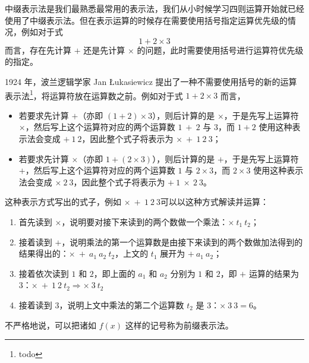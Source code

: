         中缀表示法是我们最熟悉最常用的表示法，我们从小时候学习四则运算开始就已经使用了中缀表示法。但在表示运算的时候存在需要使用括号指定运算优先级的情况，例如对于式 \[1 + 2 \times 3\] 而言，存在先计算 $+$ 还是先计算 $\times$ 的问题，此时需要使用括号进行运算符优先级的指定。

        1924 年，波兰逻辑学家 Jan {\L}ukasiewicz 提出了一种不需要使用括号的新的运算表示法\footnote{todo}，将运算符放在运算数之前。例如对于式 $1 + 2 \times 3$ 而言，
        \begin{itemize}
            \item 若要求先计算 $+$（亦即 $(1 + 2) \times 3$），则后计算的是 $\times$，于是先写上运算符 $\times$，然后写上这个运算符对应的两个运算数 $1\ +\ 2$ 与 $3$，而 $1 + 2$ 使用这种表示法会变成 $+\ 1\ 2$，因此整个式子将表示为 $\times\ +\ 1\ 2\ 3$；
            \item 若要求先计算 $\times$（亦即 $1 + (2 \times 3)$），则后计算的是 $+$，于是先写上运算符 $+$，然后写上这个运算符对应的两个运算数 $1$ 与 $2 \times 3$，而 $2 \times 3$ 使用这种表示法会变成 $\times\ 2\ 3$，因此整个式子将表示为 $+\ 1\ \times\ 2\ 3$。
        \end{itemize}
        这种表示方式写出的式子，例如 $\times\ +\ 1\ 2\ 3$可以以这种方式解读并运算：
        \begin{enumerate}
            \item 首先读到 $\times$，说明要对接下来读到的两个数做一个乘法：$\times\ t_1\ t_2$；
            \item 接着读到 $+$，说明乘法的第一个运算数是由接下来读到的两个数做加法得到的结果得出的：$\times\ +\ a_1\ a_2\ t_2$，上文的 $t_1$ 展开为 $+\ a_1\ a_2$；
            \item 接着依次读到 $1$ 和 $2$，即上面的 $a_1$ 和 $a_2$ 分别为 $1$ 和 $2$，即 $+$ 运算的结果为 $3$：$\times\ +\ 1\ 2\ t_2 \Rightarrow \times\ 3\ t_2$
            \item 接着读到 $3$，说明上文中乘法的第二个运算数 $t_2$ 是 $3$：$\times\ 3\ 3 = 6$。
        \end{enumerate}


        不严格地说，可以把诸如 $f(x)$ 这样的记号称为前缀表示法。
